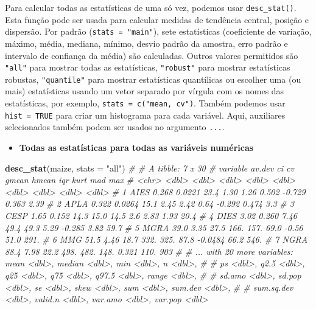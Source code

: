 \documentclass[
]{book}
\newenvironment{Shaded}{\begin{snugshade}}{\end{snugshade}}
\newcommand{\CommentTok}[1]{\textcolor[rgb]{0.56,0.35,0.01}{\textit{#1}}}
\newcommand{\DataTypeTok}[1]{\textcolor[rgb]{0.13,0.29,0.53}{#1}}
\newcommand{\KeywordTok}[1]{\textcolor[rgb]{0.13,0.29,0.53}{\textbf{#1}}}
\newcommand{\NormalTok}[1]{#1}
\newcommand{\StringTok}[1]{\textcolor[rgb]{0.31,0.60,0.02}{#1}}
\providecommand{\tightlist}{%
  \setlength{\itemsep}{0pt}\setlength{\parskip}{0pt}}
\begin{document}
Para calcular todas as estatísticas de uma só vez, podemos usar \texttt{desc\_stat()}. Esta função pode ser usada para calcular medidas de tendência central, posição e dispersão. Por padrão (\texttt{stats\ =\ "main"}), sete estatísticas (coeficiente de variação, máximo, média, mediana, mínimo, desvio padrão da amostra, erro padrão e intervalo de confiança da média) são calculadas. Outros valores permitidos são \texttt{"all"} para mostrar todas as estatísticas, \texttt{"robust"} para mostrar estatísticas robustas, \texttt{"quantile"} para mostrar estatísticas quantílicas ou escolher uma (ou mais) estatísticas usando um vetor separado por vírgula com os nomes das estatísticas, por exemplo, \texttt{stats\ =\ c("mean,\ cv")}. Também podemos usar \texttt{hist\ =\ TRUE} para criar um histograma para cada variável. Aqui, auxiliares selecionados também podem ser usados no argumento \texttt{...}.

\begin{itemize}
\tightlist
\item
  \textbf{Todas as estatísticas para todas as variáveis numéricas}
\end{itemize}

\begin{Shaded}
\begin{Highlighting}[]
\KeywordTok{desc_stat}\NormalTok{(maize, }\DataTypeTok{stats =} \StringTok{"all"}\NormalTok{)}
\CommentTok{# # A tibble: 7 x 30}
\CommentTok{#   variable av.dev     ci    cv  gmean  hmean     iqr    kurt     mad    max}
\CommentTok{#   <chr>     <dbl>  <dbl> <dbl>  <dbl>  <dbl>   <dbl>   <dbl>   <dbl>  <dbl>}
\CommentTok{# 1 AIES      0.268 0.0221 23.4    1.30   1.26   0.502 -0.729    0.363   2.39}
\CommentTok{# 2 APLA      0.322 0.0264 15.1    2.45   2.42   0.64  -0.292    0.474   3.3 }
\CommentTok{# 3 CESP      1.65  0.152  14.3   15.0   14.5    2.6    2.83     1.93   20.4 }
\CommentTok{# 4 DIES      3.02  0.260   7.46  49.4   49.3    5.29  -0.285    3.82   59.7 }
\CommentTok{# 5 MGRA     39.0   3.35   27.5  166.   157.    69.0   -0.56    51.0   291.  }
\CommentTok{# 6 MMG      51.5   4.46   18.7  332.   325.    87.8   -0.0484  66.2   546.  }
\CommentTok{# 7 NGRA     88.4   7.98   22.2  498.   482.   148.     0.321  110.    903   }
\CommentTok{# # ... with 20 more variables: mean <dbl>, median <dbl>, min <dbl>, n <dbl>,}
\CommentTok{# #   ps <dbl>, q2.5 <dbl>, q25 <dbl>, q75 <dbl>, q97.5 <dbl>, range <dbl>,}
\CommentTok{# #   sd.amo <dbl>, sd.pop <dbl>, se <dbl>, skew <dbl>, sum <dbl>, sum.dev <dbl>,}
\CommentTok{# #   sum.sq.dev <dbl>, valid.n <dbl>, var.amo <dbl>, var.pop <dbl>}
\end{Highlighting}
\end{Shaded}
\end{document}
